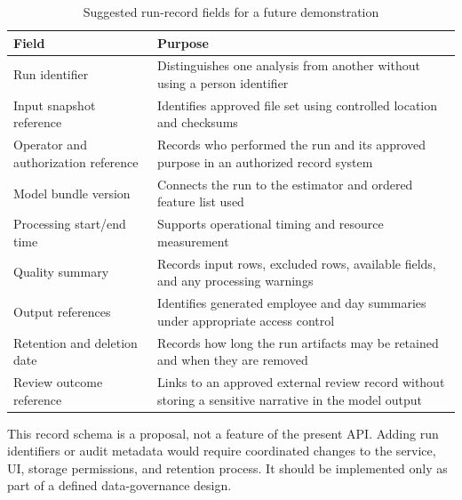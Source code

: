 \begin{table}[H]
\centering
\caption{Suggested run-record fields for a future demonstration}
\label{tab:run-record}
\small
\begin{tabularx}{\textwidth}{|p{}|X|}
\hline
Field & Purpose\\
\hline
Run identifier & Distinguishes one analysis from another without using a person identifier\\
\hline
Input snapshot reference & Identifies approved file set using controlled location and checksums\\
\hline
Operator and authorization reference & Records who performed the run and its approved purpose in an authorized record system\\
\hline
Model bundle version & Connects the run to the estimator and ordered feature list used\\
\hline
Processing start/end time & Supports operational timing and resource measurement\\
\hline
Quality summary & Records input rows, excluded rows, available fields, and any processing warnings\\
\hline
Output references & Identifies generated employee and day summaries under appropriate access control\\
\hline
Retention and deletion date & Records how long the run artifacts may be retained and when they are removed\\
\hline
Review outcome reference & Links to an approved external review record without storing a sensitive narrative in the model output\\
\hline
\end{tabularx}
\end{table}

This record schema is a proposal, not a feature of the present API.
Adding run identifiers or audit metadata would require coordinated
changes to the service, UI, storage permissions, and retention process.
It should be implemented only as part of a defined data-governance
design.


